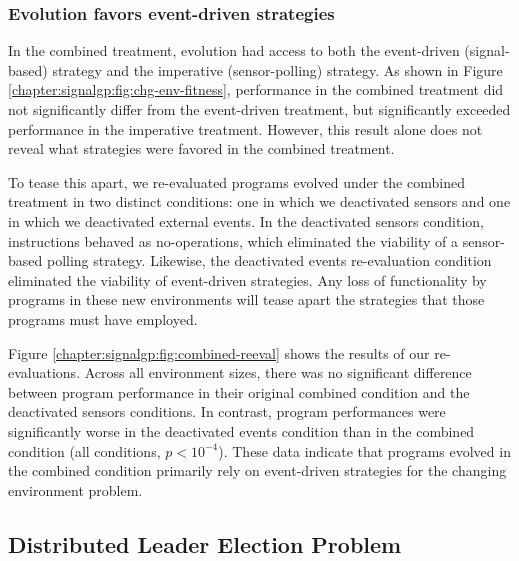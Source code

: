 \subsubsection{Evolution favors event-driven strategies}

In the combined treatment, evolution had access to both the event-driven (signal-based) strategy and the imperative (sensor-polling) strategy. 
As shown in Figure \ref{chapter:signalgp:fig:chg-env-fitness}, performance in the combined treatment did not significantly differ from the event-driven treatment, but significantly exceeded performance in the imperative treatment. 
However, this result alone does not reveal what strategies were favored in the combined treatment. 

To tease this apart, we re-evaluated programs evolved under the combined treatment in two distinct conditions:
one in which we deactivated sensors and one in which we deactivated external events. 
In the deactivated sensors condition,  instructions behaved as no-operations, which eliminated the viability of a sensor-based polling strategy.
Likewise, the deactivated events re-evaluation condition eliminated the viability of event-driven strategies.  
Any loss of functionality by programs in these new environments will tease apart the strategies that those programs must have employed.



Figure \ref{chapter:signalgp:fig:combined-reeval} shows the results of our re-evaluations. 
Across all environment sizes, there was no significant difference between program performance in their original combined condition and the deactivated sensors conditions. 
In contrast, program performances were significantly worse in the deactivated events condition than in the combined condition (all conditions, $p<10^{-4}$).
These data indicate that programs evolved in the combined condition primarily rely on event-driven strategies for the changing environment problem. 

\subsection{Distributed Leader Election Problem}

